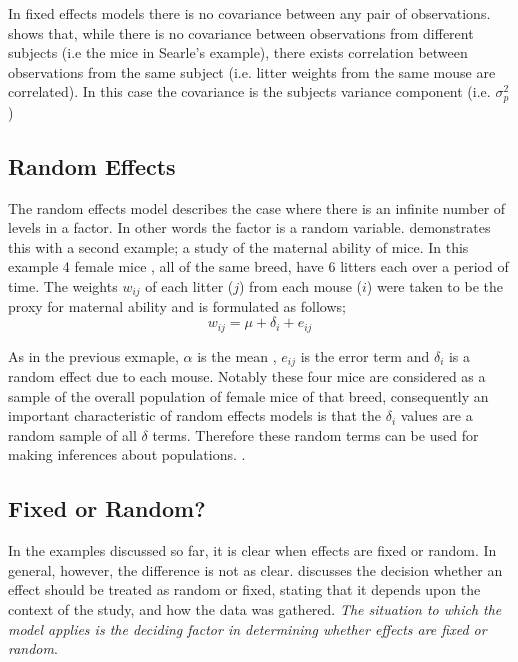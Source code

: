 \documentclass[12pt, a4paper]{report}
\theoremstyle{plain}
\theoremstyle{definition}
\theoremstyle{remark}
\begin{document}
In fixed effects models there is no covariance between any pair of
observations. \citet*{BrownPrescott} shows that, while there is no
covariance between observations from different subjects (i.e the
mice in Searle's example), there exists correlation between
observations from the same subject (i.e. litter weights from the
same mouse are correlated). In this case the covariance is the
subjects variance component (i.e. $\sigma^{2}_{p}$)

\newpage


\subsection{Random Effects}
The random effects model describes the case where there is an
infinite number of levels in a factor. In other words the factor
is a random variable. \citet{Searle} demonstrates this with a
second example; a study of the maternal ability of mice. In this
example 4 female mice , all of the same breed, have 6 litters each
over a period of time. The weights $w_{ij}$ of each litter ($j$)
from each mouse ($i$) were taken to be the proxy for maternal
ability and is formulated as follows;
\begin{equation}
w_{ij} = \mu + \delta_{i} + e_{ij}
\end{equation}

As in the previous exmaple, $\alpha$ is the mean , $e_{ij}$ is the
error term and $\delta_{i}$ is a random effect due to each mouse.
Notably these four mice are considered as a sample of the overall
population of female mice of that breed, consequently an important
characteristic of random effects models is that the $\delta_{i}$
values are a random sample of all $\delta$ terms. Therefore these
random terms can be used for making inferences about populations.
\citep{McCullSearle}.


\subsection{Fixed or Random?}

In the examples discussed so far, it is clear when effects are
fixed or random. In general, however, the difference is not as
clear. \citet{Searle} discusses the decision whether an effect
should be treated as random or fixed, stating that it depends upon
the context of the study, and how the data was gathered. \emph{The
	situation to which the model applies is the deciding factor in
	determining whether effects are fixed or random}.
\end{document}
